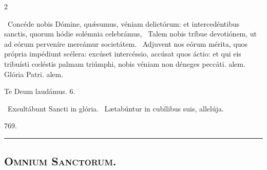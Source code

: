 \documentclass[9pt,twoside]{extarticle}
\begin{document}
\begin{multicols}{2}
\begin{tightlist}{}
\item {}
\item {}~Concéde nobis Dómine, quǽsumus, véniam delictórum: et intercedéntibus sanctis, quorum hódie solémnia celebrámus, \textred{*}~Talem nobis tríbue devotiónem, ut ad eórum perveníre mereámur societátem.
~Adjuvent nos eórum mérita, quos própria impédiunt scélera: excúset intercéssio, accúsat quos áctio: et qui eis tribuísti cœléstis palmam triúmphi, nobis véniam non déneges peccáti. alem. Glória Patri. alem.
\item Te Deum laudámus. 6.
\item {}~Exsultábunt Sancti in glória. ~Lætabúntur in cubílibus suis, allelúja.
\end{tightlist}

\begin{tightlist}{}
\item {} 769.
\item {}
\end{tightlist}


\begin{center}\textcolor{red}{\rule{\linewidth}{0.5pt}} \end{center}

\subsection*{\center {}}
\subsubsection*{\center {}}
\subsection*{\center \textsc{Omnium Sanctorum.}}
\subsubsection*{\center {}}


\end{multicols}
\end{document}
